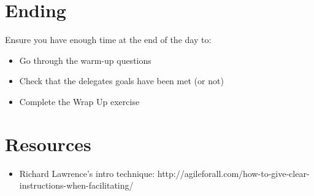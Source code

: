     \section*{Ending}
    
    Ensure you have enough time at the end of the day to:
    
    \begin{itemize}
        \item Go through the warm-up questions
        \item Check that the delegates goals have been met (or not)
        \item Complete the Wrap Up exercise
    \end{itemize}

    
    \section*{Resources}
    
    \begin{itemize}
        \item Richard Lawrence's intro technique: http://agileforall.com/how-to-give-clear-instructions-when-facilitating/
    \end{itemize}

\fi 

